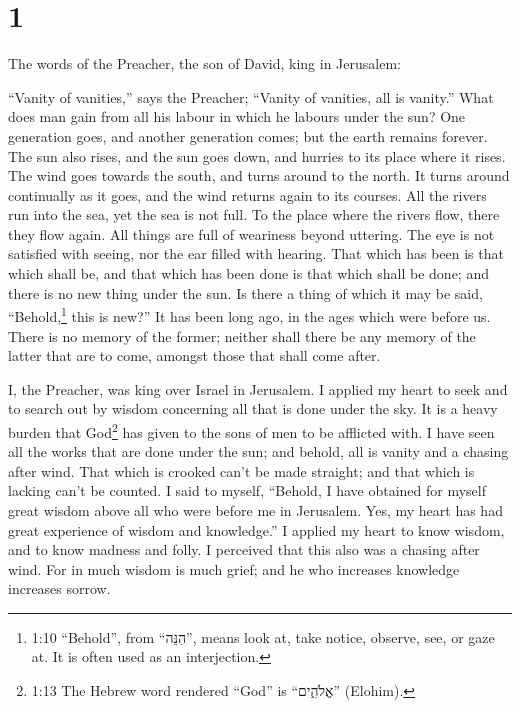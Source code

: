 \hypertarget{section}{%
\section{1}\label{section}}

 The words of the Preacher, the son of David, king in
Jerusalem:

 ``Vanity of vanities,'' says the Preacher; ``Vanity of
vanities, all is vanity.''  What does man gain from all his
labour in which he labours under the sun?  One generation
goes, and another generation comes; but the earth remains forever.
 The sun also rises, and the sun goes down, and hurries to
its place where it rises.  The wind goes towards the south,
and turns around to the north. It turns around continually as it goes,
and the wind returns again to its courses.  All the rivers
run into the sea, yet the sea is not full. To the place where the rivers
flow, there they flow again.  All things are full of
weariness beyond uttering. The eye is not satisfied with seeing, nor the
ear filled with hearing.  That which has been is that which
shall be, and that which has been done is that which shall be done; and
there is no new thing under the sun.  Is there a thing of
which it may be said, ``Behold,\footnote{1:10 ``Behold'', from
  ``הִנֵּה'', means look at, take notice, observe, see, or gaze at. It
  is often used as an interjection.} this is new?'' It has been long
ago, in the ages which were before us.  There is no memory
of the former; neither shall there be any memory of the latter that are
to come, amongst those that shall come after.

 I, the Preacher, was king over Israel in Jerusalem.
 I applied my heart to seek and to search out by wisdom
concerning all that is done under the sky. It is a heavy burden that
God\footnote{1:13 The Hebrew word rendered ``God'' is ``אֱלֹהִ֑ים''
  (Elohim).} has given to the sons of men to be afflicted with.
 I have seen all the works that are done under the sun; and
behold, all is vanity and a chasing after wind.  That which
is crooked can't be made straight; and that which is lacking can't be
counted.  I said to myself, ``Behold, I have obtained for
myself great wisdom above all who were before me in Jerusalem. Yes, my
heart has had great experience of wisdom and knowledge.'' 
I applied my heart to know wisdom, and to know madness and folly. I
perceived that this also was a chasing after wind.  For in
much wisdom is much grief; and he who increases knowledge increases
sorrow.

